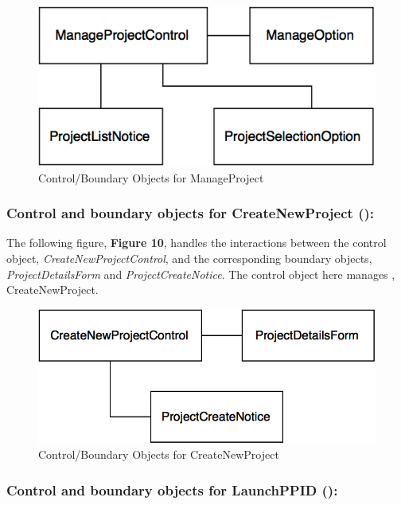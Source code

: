 \documentclass[12pt,letterpaper]{article}
\begin{document}
\vspace{1em}

\begin{figure}[H]
	\centering{}
	\includegraphics[scale=0.37]{imgs/cbod/manage-project.png}
	\caption{Control/Boundary Objects for ManageProject}
\end{figure}

\newpage{}

\subsubsection*{Control and boundary objects for CreateNewProject (\createnewproject{}):}

The following figure, {\bf Figure 10}, handles the interactions between the control object, {\it CreateNewProjectControl}, and the corresponding
boundary objects, {\it ProjectDetailsForm} and {\it ProjectCreateNotice}. The control object here manages \createnewproject{}, CreateNewProject.

\begin{figure}[H]
	\centering{}
	\includegraphics[scale=0.37]{imgs/cbod/create-new-project.png}
	\caption{Control/Boundary Objects for CreateNewProject}
\end{figure}

\subsubsection*{Control and boundary objects for LaunchPPID (\launchppid{}):}
\end{document}
